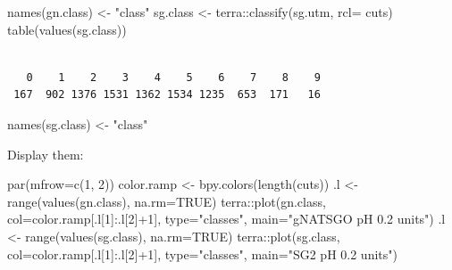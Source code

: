 \documentclass[
  letterpaper,
  DIV=11,
  numbers=noendperiod]{scrartcl}
\newenvironment{Shaded}{\begin{snugshade}}{\end{snugshade}}
\newcommand{\AttributeTok}[1]{\textcolor[rgb]{0.40,0.45,0.13}{#1}}
\newcommand{\ConstantTok}[1]{\textcolor[rgb]{0.56,0.35,0.01}{#1}}
\newcommand{\DecValTok}[1]{\textcolor[rgb]{0.68,0.00,0.00}{#1}}
\newcommand{\FunctionTok}[1]{\textcolor[rgb]{0.28,0.35,0.67}{#1}}
\newcommand{\NormalTok}[1]{\textcolor[rgb]{0.00,0.23,0.31}{#1}}
\newcommand{\OtherTok}[1]{\textcolor[rgb]{0.00,0.23,0.31}{#1}}
\newcommand{\SpecialCharTok}[1]{\textcolor[rgb]{0.37,0.37,0.37}{#1}}
\newcommand{\StringTok}[1]{\textcolor[rgb]{0.13,0.47,0.30}{#1}}
\begin{document}
\begin{Shaded}
\begin{Highlighting}[]
\FunctionTok{names}\NormalTok{(gn.class) }\OtherTok{\textless{}{-}} \StringTok{"class"}
\NormalTok{sg.class }\OtherTok{\textless{}{-}}\NormalTok{ terra}\SpecialCharTok{::}\FunctionTok{classify}\NormalTok{(sg.utm, }\AttributeTok{rcl=}\NormalTok{ cuts)}
\FunctionTok{table}\NormalTok{(}\FunctionTok{values}\NormalTok{(sg.class))}
\end{Highlighting}
\end{Shaded}

\begin{verbatim}

   0    1    2    3    4    5    6    7    8    9 
 167  902 1376 1531 1362 1534 1235  653  171   16 
\end{verbatim}

\begin{Shaded}
\begin{Highlighting}[]
\FunctionTok{names}\NormalTok{(sg.class) }\OtherTok{\textless{}{-}} \StringTok{"class"}
\end{Highlighting}
\end{Shaded}

Display them:

\begin{Shaded}
\begin{Highlighting}[]
\FunctionTok{par}\NormalTok{(}\AttributeTok{mfrow=}\FunctionTok{c}\NormalTok{(}\DecValTok{1}\NormalTok{, }\DecValTok{2}\NormalTok{))}
\NormalTok{color.ramp }\OtherTok{\textless{}{-}} \FunctionTok{bpy.colors}\NormalTok{(}\FunctionTok{length}\NormalTok{(cuts))}
\NormalTok{.l }\OtherTok{\textless{}{-}} \FunctionTok{range}\NormalTok{(}\FunctionTok{values}\NormalTok{(gn.class), }\AttributeTok{na.rm=}\ConstantTok{TRUE}\NormalTok{)}
\NormalTok{terra}\SpecialCharTok{::}\FunctionTok{plot}\NormalTok{(gn.class,}
            \AttributeTok{col=}\NormalTok{color.ramp[.l[}\DecValTok{1}\NormalTok{]}\SpecialCharTok{:}\NormalTok{.l[}\DecValTok{2}\NormalTok{]}\SpecialCharTok{+}\DecValTok{1}\NormalTok{], }\AttributeTok{type=}\StringTok{"classes"}\NormalTok{,}
            \AttributeTok{main=}\StringTok{"gNATSGO pH 0.2 units"}\NormalTok{)}
\NormalTok{.l }\OtherTok{\textless{}{-}} \FunctionTok{range}\NormalTok{(}\FunctionTok{values}\NormalTok{(sg.class), }\AttributeTok{na.rm=}\ConstantTok{TRUE}\NormalTok{)}
\NormalTok{terra}\SpecialCharTok{::}\FunctionTok{plot}\NormalTok{(sg.class,}
            \AttributeTok{col=}\NormalTok{color.ramp[.l[}\DecValTok{1}\NormalTok{]}\SpecialCharTok{:}\NormalTok{.l[}\DecValTok{2}\NormalTok{]}\SpecialCharTok{+}\DecValTok{1}\NormalTok{], }\AttributeTok{type=}\StringTok{"classes"}\NormalTok{,}
            \AttributeTok{main=}\StringTok{"SG2 pH 0.2 units"}\NormalTok{)}
\end{Highlighting}
\end{Shaded}
\end{document}
